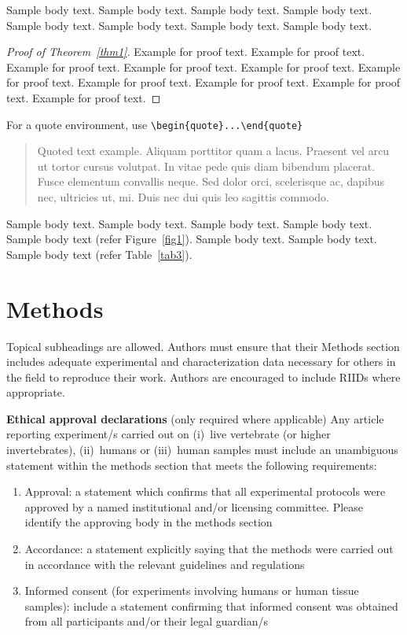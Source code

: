 \documentclass[sn-mathphys]{sn-jnl}%
\theoremstyle{thmstyleone}%
\theoremstyle{thmstyletwo}%
\theoremstyle{thmstylethree}%
\begin{document}
Sample body text. Sample body text. Sample body text. Sample body text. Sample body text. Sample body text. Sample body text. Sample body text.

\begin{proof}[Proof of Theorem~{\upshape\ref{thm1}}]
Example for proof text. Example for proof text. Example for proof text. Example for proof text. Example for proof text. Example for proof text. Example for proof text. Example for proof text. Example for proof text. Example for proof text. 
\end{proof}

\noindent
For a quote environment, use \verb+\begin{quote}...\end{quote}+
\begin{quote}
Quoted text example. Aliquam porttitor quam a lacus. Praesent vel arcu ut tortor cursus volutpat. In vitae pede quis diam bibendum placerat. Fusce elementum
convallis neque. Sed dolor orci, scelerisque ac, dapibus nec, ultricies ut, mi. Duis nec dui quis leo sagittis commodo.
\end{quote}

Sample body text. Sample body text. Sample body text. Sample body text. Sample body text (refer Figure~\ref{fig1}). Sample body text. Sample body text. Sample body text (refer Table~\ref{tab3}). 

\section{Methods}\label{sec11}

Topical subheadings are allowed. Authors must ensure that their Methods section includes adequate experimental and characterization data necessary for others in the field to reproduce their work. Authors are encouraged to include RIIDs where appropriate. 

\textbf{Ethical approval declarations} (only required where applicable) Any article reporting experiment/s carried out on (i)~live vertebrate (or higher invertebrates), (ii)~humans or (iii)~human samples must include an unambiguous statement within the methods section that meets the following requirements: 

\begin{enumerate}[1.]
\item Approval: a statement which confirms that all experimental protocols were approved by a named institutional and/or licensing committee. Please identify the approving body in the methods section

\item Accordance: a statement explicitly saying that the methods were carried out in accordance with the relevant guidelines and regulations

\item Informed consent (for experiments involving humans or human tissue samples): include a statement confirming that informed consent was obtained from all participants and/or their legal guardian/s
\end{enumerate}
\end{document}
